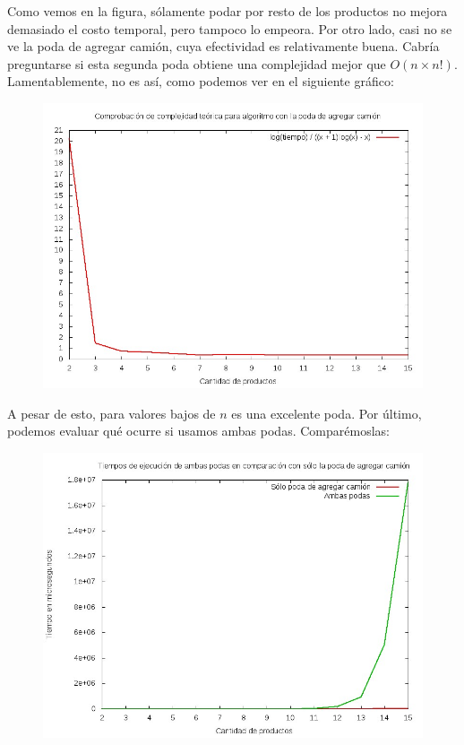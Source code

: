 Como vemos en la figura, sólamente podar por resto de los productos no mejora demasiado el costo temporal, pero tampoco lo empeora. Por otro lado, casi no se ve la poda de agregar camión, cuya efectividad es relativamente buena. Cabría preguntarse si esta segunda poda obtiene una complejidad mejor que $O(n \times n!)$. Lamentablemente, no es así, como podemos ver en el siguiente gráfico:

\begin{figure}[H]
	\begin{minipage}[t]{\linewidth}
		\centering
		\includegraphics[width=\textwidth]{complejidad_con_poda_camion.jpg}
		\label{fig:p3_complejidad_con_poda_camion}
	\end{minipage}
\end{figure}

A pesar de esto, para valores bajos de $n$ es una excelente poda. Por último, podemos evaluar qué ocurre si usamos ambas podas. Comparémoslas:

\begin{figure}[H]
	\begin{minipage}[t]{\linewidth}
		\centering
		\includegraphics[width=\textwidth]{comparacion_poda_camion_con_ambas_podas.jpg}
		\label{fig:p3_comparacion_poda_camion_con_ambas_podas}
	\end{minipage}
\end{figure}

